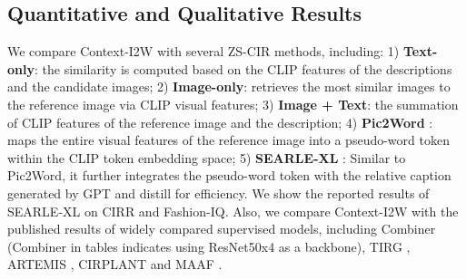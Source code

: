 \documentclass[letterpaper]{article} \usepackage{aaai24}  \usepackage{times}  \usepackage{helvet}  \usepackage{courier}  \usepackage[hyphens]{url}  \usepackage{graphicx} \urlstyle{rm} \def\UrlFont{\rm}  \usepackage{natbib}  \usepackage{caption} \frenchspacing  \setlength{\pdfpagewidth}{8.5in} \setlength{\pdfpageheight}{11in} \usepackage{algorithm}
\begin{document}
\subsection{Quantitative and Qualitative Results}

We compare Context-I2W with several ZS-CIR methods, including: 1) \textbf{Text-only}: the similarity is computed based on the CLIP features of the descriptions and the candidate images; 2) \textbf{Image-only}: retrieves the most similar images to the reference image via CLIP visual features; 3) \textbf{Image + Text}: the summation of CLIP features of the reference image and the description; 4)  \textbf{Pic2Word} \cite{Saito_2023_CVPR}: maps the entire visual features of the reference image into a pseudo-word token within the CLIP token embedding space; 5) \textbf{SEARLE-XL} \cite{baldrati2023zero}: Similar to Pic2Word, it further integrates the pseudo-word token with the relative caption generated by GPT \cite{brown2020language} and distill for efficiency.  
We show the reported results of SEARLE-XL on CIRR and Fashion-IQ. Also, we compare Context-I2W with the published results of widely compared supervised models, including Combiner \cite{Baldrati_2022_CVPR} (Combiner  in tables indicates using ResNet50x4 as a backbone), TIRG \cite{vo2019composing}, ARTEMIS \cite{delmas2022artemis}, CIRPLANT\cite{Liu_2021_ICCV} and MAAF \cite{dodds2020modality}.
\end{document}

